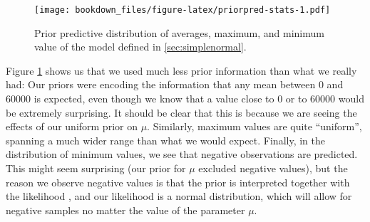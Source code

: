 \documentclass[12pt,]{krantz}
\newenvironment{Shaded}{\begin{snugshade}}{\end{snugshade}}
\newcommand{\CommentTok}[1]{\textcolor[rgb]{0.56,0.35,0.01}{\textit{#1}}}
\newcommand{\DataTypeTok}[1]{\textcolor[rgb]{0.13,0.29,0.53}{#1}}
\newcommand{\DecValTok}[1]{\textcolor[rgb]{0.00,0.00,0.81}{#1}}
\newcommand{\KeywordTok}[1]{\textcolor[rgb]{0.13,0.29,0.53}{\textbf{#1}}}
\newcommand{\NormalTok}[1]{#1}
\newcommand{\OperatorTok}[1]{\textcolor[rgb]{0.81,0.36,0.00}{\textbf{#1}}}
\newcommand{\StringTok}[1]{\textcolor[rgb]{0.31,0.60,0.02}{#1}}
\theoremstyle{definition}
\theoremstyle{definition}
\theoremstyle{definition}
\theoremstyle{remark}
\begin{document}
\begin{Shaded}
\end{Shaded}

\begin{figure}
\centering
\texttt{[image: bookdown\_files/figure-latex/priorpred-stats-1.pdf]}
\caption{\label{fig:priorpred-stats}Prior predictive distribution of averages, maximum, and minimum value of the model defined in \ref{sec:simplenormal}.}
\end{figure}

Figure \ref{fig:priorpred-stats} shows us that we used much less prior information than what we really had: Our priors were encoding the information that any mean between 0 and 60000 is expected, even though we know that a value close to 0 or to 60000 would be extremely surprising. It should be clear that this is because we are seeing the effects of our uniform prior on \(\mu\). Similarly, maximum values are quite ``uniform'', spanning a much wider range than what we would expect. Finally, in the distribution of minimum values, we see that negative observations are predicted. This might seem surprising (our prior for \(\mu\) excluded negative values), but the reason we observe negative values is that the prior is interpreted together with the likelihood \citep{gelmanPriorCanOften2017}, and our likelihood is a normal distribution, which will allow for negative samples no matter the value of the parameter \(\mu\).
\end{document}
